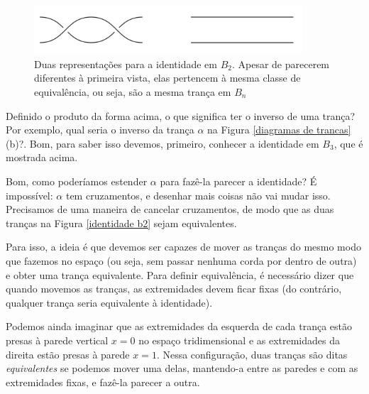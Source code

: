 \documentclass[a4paper,portuguese,11pt,twoside, leqno]{book}
\theoremstyle{definition}
\begin{document}
	\begin{figure}[H]
		
		\captionsetup{justification=centering}
		\begin{center}
			\includegraphics[width=10cm]{Images/identidade_b2.png}
		\end{center}\caption{Duas representações para a identidade em $B_2$. Apesar de parecerem diferentes à primeira vista, elas pertencem à mesma classe de equivalência, ou seja, são a mesma trança em $B_n$}\label{identidade b2}
	\end{figure}
	
	\par\vspace{0.3cm} Definido o produto da forma acima, o que significa ter o inverso de uma trança? Por exemplo, qual seria o inverso da trança $\alpha$ na Figura \eqref{diagramas de trancas}(b)?. Bom, para saber isso devemos, primeiro, conhecer a identidade em $B_3$, que é mostrada acima.
	
	\par\vspace{0.3cm} Bom, como poderíamos estender $\alpha$ para fazê-la parecer a identidade? É impossível: $\alpha$ tem cruzamentos, e desenhar mais coisas não vai mudar isso. Precisamos de uma maneira de cancelar cruzamentos, de modo que as duas tranças na Figura \eqref{identidade b2} sejam equivalentes. 
	
	\par\vspace{0.3cm} Para isso, a ideia é que devemos ser capazes de mover as tranças do mesmo modo que fazemos no espaço (ou seja, sem passar nenhuma corda por dentro de outra) e obter uma trança equivalente. Para definir equivalência, é necessário dizer que quando movemos as tranças, as extremidades devem ficar fixas (do contrário, qualquer trança seria equivalente à identidade).
	
	\par\vspace{0.3cm} Podemos ainda imaginar que as extremidades da esquerda de cada trança estão presas à parede vertical $x=0$ no espaço tridimensional e as extremidades da direita estão presas à parede $x=1$. Nessa configuração, duas tranças são ditas \textit{equivalentes} se podemos mover uma delas, mantendo-a entre as paredes e com as extremidades fixas, e fazê-la parecer a outra. 
	
\end{document}
